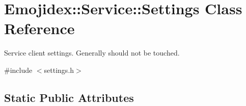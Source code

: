 \hypertarget{classEmojidex_1_1Service_1_1Settings}{}\section{Emojidex\+:\+:Service\+:\+:Settings Class Reference}
\label{classEmojidex_1_1Service_1_1Settings}


Service client settings. Generally should not be touched.  




{\ttfamily \#include $<$settings.\+h$>$}

\subsection*{Static Public Attributes}
